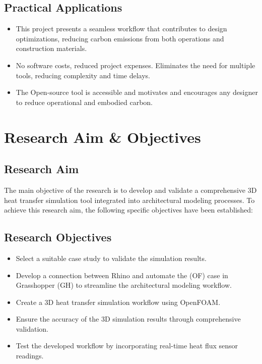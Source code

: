 \subsection{Practical Applications}
\begin{itemize}
\item This project presents a seamless workflow that contributes to design optimizations, reducing carbon emissions from both operations and construction materials.
\item No software costs, reduced project expenses. Eliminates the need for multiple tools, reducing complexity and time delays.
\item The Open-source tool is accessible and motivates and encourages any designer to reduce operational and embodied carbon.


\end{itemize}
\section{Research Aim \& Objectives}
\subsection{Research Aim}
The main objective of the research is to develop and validate a comprehensive 3D heat transfer simulation tool integrated into architectural modeling processes. To achieve this research aim, the following specific objectives have been established:

\subsection{Research Objectives}
\begin{itemize}
    \item Select a suitable case study to validate the simulation results.
    \item Develop a connection between Rhino and automate the (\gls{OF}) case in Grasshopper (\gls{GH}) to streamline the architectural modeling workflow. 
    \item  Create a 3D heat transfer simulation workflow using OpenFOAM.
    \item Ensure the accuracy of the 3D simulation results through comprehensive validation.
    \item Test the developed workflow by incorporating real-time heat flux sensor readings.
 
\end{itemize}







